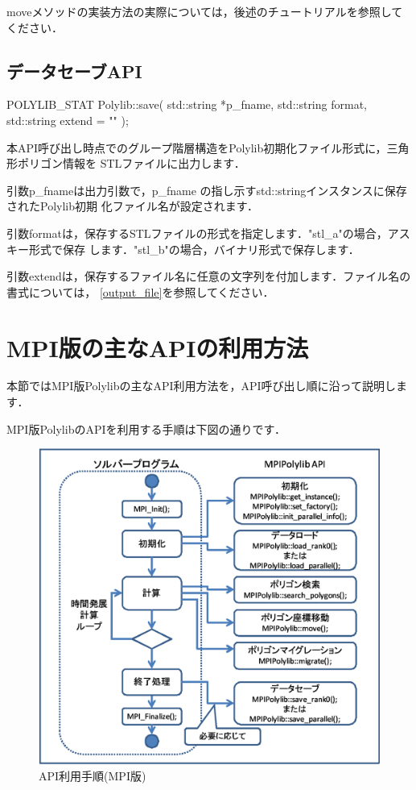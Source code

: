 {moveメソッドの実装方法の実際については，後述のチュートリアルを参照してください．

%
\subsection{データセーブAPI} \label{datasave_api}

\begin{program}
	POLYLIB_STAT Polylib::save(
		std::string	*p_fname,
		std::string	format,
		std::string	extend = ""
	);
\end{program}

本API呼び出し時点でのグループ階層構造をPolylib初期化ファイル形式に，三角形ポリゴン情報を
STLファイルに出力します．

引数p\_fnameは出力引数で，p\_fname の指し示すstd::stringインスタンスに保存されたPolylib初期
化ファイル名が設定されます．

引数formatは，保存するSTLファイルの形式を指定します．"stl\_a"の場合，アスキー形式で保存
します．"stl\_b"の場合，バイナリ形式で保存します．

引数extendは，保存するファイル名に任意の文字列を付加します．ファイル名の書式については，
\ref{output_file}を参照してください．


\pagebreak

%
\section{MPI版の主なAPIの利用方法}

本節ではMPI版Polylibの主なAPI利用方法を，API呼び出し順に沿って説明します．

MPI版PolylibのAPIを利用する手順は下図の通りです．

\begin{figure}[H]
 \centering
 \includegraphics[width=12cm]{clip005.eps}
 \caption{API利用手順(MPI版)}
\end{figure}

}
